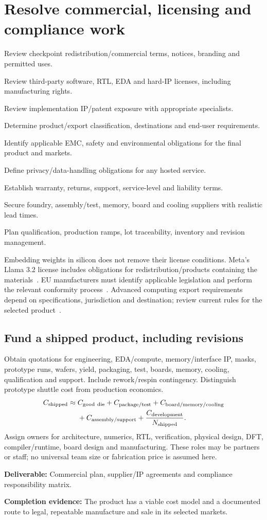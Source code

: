\documentclass[11pt,a4paper]{article}
\newcommand{\phase}[2]{\clearpage\section{#1}\label{#2}}
\newcommand{\deliver}[2]{\begin{tcolorbox}[colback=pale,colframe=line,boxrule=0.5pt,arc=1mm,left=8pt,right=8pt,top=6pt,bottom=6pt]\textbf{Deliverable:} #1\par\textbf{Completion evidence:} #2\end{tcolorbox}}
\begin{document}
\phase{Resolve commercial, licensing and compliance work}{sec:commercial}
\begin{checklist}
\item Review checkpoint redistribution/commercial terms, notices, branding and permitted uses.
\item Review third-party software, RTL, EDA and hard-IP licenses, including manufacturing rights.
\item Review implementation IP/patent exposure with appropriate specialists.
\item Determine product/export classification, destinations and end-user requirements.
\item Identify applicable EMC, safety and environmental obligations for the final product and markets.
\item Define privacy/data-handling obligations for any hosted service.
\item Establish warranty, returns, support, service-level and liability terms.
\item Secure foundry, assembly/test, memory, board and cooling suppliers with realistic lead times.
\item Plan qualification, production ramps, lot traceability, inventory and revision management.
\end{checklist}
Embedding weights in silicon does not remove their license conditions. Meta's
Llama 3.2 license includes obligations for redistribution/products containing
the materials~\cite{llama-license}. EU manufacturers must identify applicable
legislation and perform the relevant conformity process~\cite{eu}. Advanced
computing export requirements depend on specifications, jurisdiction and
destination; review current rules for the selected product~\cite{bis}.

\subsection*{Fund a shipped product, including revisions}
Obtain quotations for engineering, EDA/compute, memory/interface IP, masks,
prototype runs, wafers, yield, packaging, test, boards, memory, cooling,
qualification and support. Include rework/respin contingency. Distinguish
prototype shuttle cost from production economics.
\begin{align*}
C_{\rm shipped}\approx{}&C_{\rm good\ die}+C_{\rm package/test}
+C_{\rm board/memory/cooling}\\
&+C_{\rm assembly/support}+\frac{C_{\rm development}}{N_{\rm shipped}}.
\end{align*}
Assign owners for architecture, numerics, RTL, verification, physical design,
DFT, compiler/runtime, board design and manufacturing. These roles may be
partners or staff; no universal team size or fabrication price is assumed here.
\deliver{Commercial plan, supplier/IP agreements and compliance responsibility
matrix.}{The product has a viable cost model and a documented route to legal,
repeatable manufacture and sale in its selected markets.}
\end{document}
